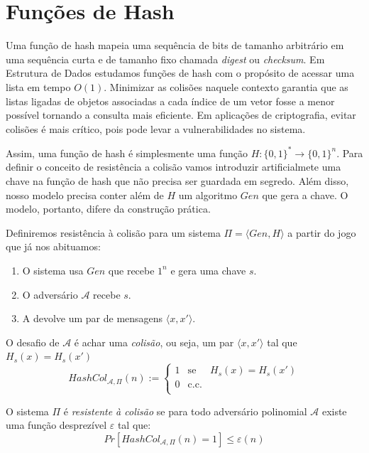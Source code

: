 \chapter{Funções de Hash}
\label{cha:hash}

Uma função de hash mapeia uma sequência de bits de tamanho arbitrário em uma sequência curta e de tamanho fixo chamada {\em digest} ou {\em checksum}.
Em Estrutura de Dados estudamos funções de hash com o propósito de acessar uma lista em tempo $O(1)$.
Minimizar as colisões naquele contexto garantia que as listas ligadas de objetos associadas a cada índice de um vetor fosse a menor possível tornando a consulta mais eficiente.
Em aplicações de criptografia, evitar colisões é mais crítico, pois pode levar a vulnerabilidades no sistema.

Assim, uma função de hash é simplesmente uma função $H: \{0,1\}^* \to \{0,1\}^n$.
Para definir o conceito de resistência a colisão vamos introduzir artificialmete uma chave na função de hash que não precisa ser guardada em segredo.
Além disso, nosso modelo precisa conter além de $H$ um algoritmo $Gen$ que gera a chave.
O modelo, portanto, difere da construção prática.

Definiremos resistência à colisão para um sistema $\Pi = \langle Gen, H \rangle$ a partir do jogo que já nos abituamos:
\begin{enumerate}
\item O sistema usa $Gen$ que recebe $1^n$ e gera uma chave $s$.
\item O adversário $\mathcal{A}$ recebe $s$.
\item A devolve um par de mensagens $\langle x, x' \rangle$.
\end{enumerate}

O desafio de $\mathcal{A}$ é achar uma {\em colisão}, ou seja, um par $\langle x, x' \rangle$ tal que $H_s(x) = H_s(x')$
\begin{displaymath}
  HashCol_{\mathcal{A}, \Pi}(n) := \left\{
    \begin{array}{lcl}
      1 & \textrm{se} & H_s(x) = H_s(x')\\
      0 & \textrm{c.c.} &\\
    \end{array}
    \right.
\end{displaymath}

O sistema $\Pi$ é {\em resistente à colisão} \cite{Damgard88} se para todo adversário polinomial $\mathcal{A}$ existe uma função desprezível $\varepsilon$ tal que:
\begin{displaymath}
  Pr[HashCol_{\mathcal{A}, \Pi}(n) = 1] \leq \varepsilon(n)
\end{displaymath}

